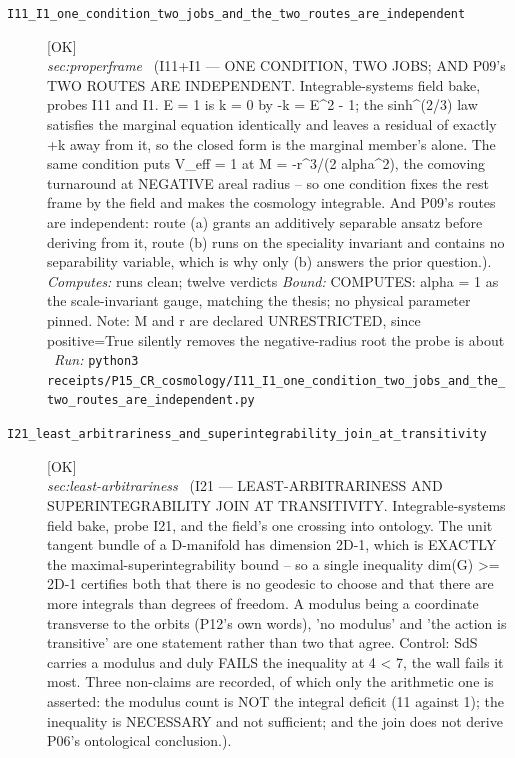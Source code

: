 \begin{description}
\item[\label{rcpt:I11_I1_one_condition_two_jobs_and_the_two_routes_are_independent}\texttt{I11\_I1\_one\_condition\_two\_jobs\_and\_the\_two\_routes\_are\_independent}]\hfill\textsf{[OK]}\\
\textit{sec:properframe} \ (I11+I1 --- ONE CONDITION, TWO JOBS; AND P09's TWO ROUTES ARE INDEPENDENT. Integrable-systems field bake, probes I11 and I1. E = 1 is k = 0 by -k = E\textasciicircum{}2 - 1; the sinh\textasciicircum{}(2/3) law satisfies the marginal equation identically and leaves a residual of exactly +k away from it, so the closed form is the marginal member's alone. The same condition puts V\_eff = 1 at M = -r\textasciicircum{}3/(2 alpha\textasciicircum{}2), the comoving turnaround at NEGATIVE areal radius -- so one condition fixes the rest frame by the field and makes the cosmology integrable. And P09's routes are independent: route (a) grants an additively separable ansatz before deriving from it, route (b) runs on the speciality invariant and contains no separability variable, which is why only (b) answers the prior question.). 
\emph{Computes:} runs clean; twelve verdicts
 \emph{Bound:} COMPUTES: alpha = 1 as the scale-invariant gauge, matching the thesis; no physical parameter pinned. Note: M and r are declared UNRESTRICTED, since positive=True silently removes the negative-radius root the probe is about
\ \emph{Run:} \texttt{python3 receipts/P15\_CR\_cosmology/I11\_I1\_one\_condition\_two\_jobs\_and\_the\_two\_routes\_are\_independent.py}
\item[\label{rcpt:I21_least_arbitrariness_and_superintegrability_join_at_transitivity}\texttt{I21\_least\_arbitrariness\_and\_superintegrability\_join\_at\_transitivity}]\hfill\textsf{[OK]}\\
\textit{sec:least-arbitrariness} \ (I21 --- LEAST-ARBITRARINESS AND SUPERINTEGRABILITY JOIN AT TRANSITIVITY. Integrable-systems field bake, probe I21, and the field's one crossing into ontology. The unit tangent bundle of a D-manifold has dimension 2D-1, which is EXACTLY the maximal-superintegrability bound -- so a single inequality dim(G) >= 2D-1 certifies both that there is no geodesic to choose and that there are more integrals than degrees of freedom. A modulus being a coordinate transverse to the orbits (P12's own words), 'no modulus' and 'the action is transitive' are one statement rather than two that agree. Control: SdS carries a modulus and duly FAILS the inequality at 4 < 7, the wall fails it most. Three non-claims are recorded, of which only the arithmetic one is asserted: the modulus count is NOT the integral deficit (11 against 1); the inequality is NECESSARY and not sufficient; and the join does not derive P06's ontological conclusion.). 

\end{description}

